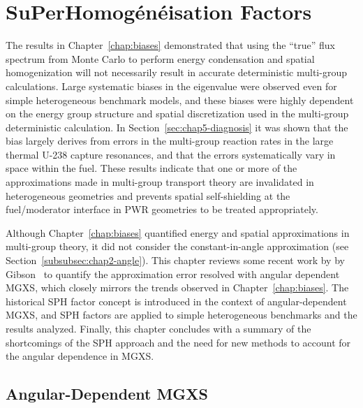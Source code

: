\chapter{SuPerHomog\'{e}n\'{e}isation Factors}
\label{chap:sph}

The results in Chapter~\ref{chap:biases} demonstrated that using the ``true'' flux spectrum from Monte Carlo to perform energy condensation and spatial homogenization will not necessarily result in accurate deterministic multi-group calculations. Large systematic biases in the eigenvalue were observed even for simple heterogeneous benchmark models, and these biases were highly dependent on the energy group structure and spatial discretization used in the multi-group deterministic calculation. In Section~\ref{sec:chap5-diagnosis} it was shown that the bias largely derives from errors in the multi-group reaction rates in the large thermal U-238 capture resonances, and that the errors systematically vary in space within the fuel. These results indicate that one or more of the approximations made in multi-group transport theory are invalidated in heterogeneous geometries and prevents spatial self-shielding at the fuel/moderator interface in \ac{PWR} geometries to be treated appropriately.

Although Chapter~\ref{chap:biases} quantified energy and spatial approximations in multi-group theory, it did not consider the constant-in-angle approximation (see Section~\ref{subsubsec:chap2-angle}). This chapter reviews some recent work by by Gibson~\cite{gibson2016thesis} to quantify the approximation error resolved with angular dependent \ac{MGXS}, which closely mirrors the trends observed in Chapter~\ref{chap:biases}. The historical \ac{SPH} factor concept is introduced in the context of angular-dependent \ac{MGXS}, and \ac{SPH} factors are applied to simple heterogeneous benchmarks and the results analyzed. Finally, this chapter concludes with a summary of the shortcomings of the \ac{SPH} approach and the need for new methods to account for the angular dependence in \ac{MGXS}.


\section{Angular-Dependent MGXS}
\label{sec:chap5-angular-mgxs}


